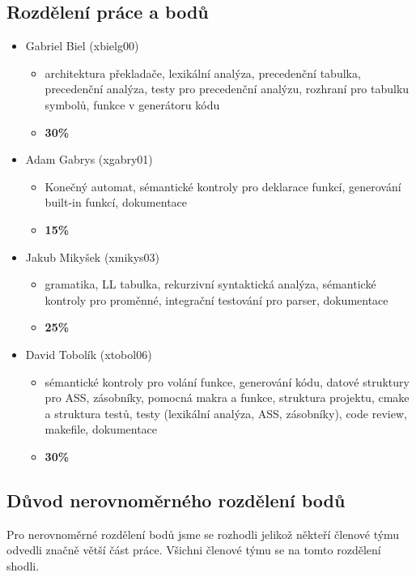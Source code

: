 \documentclass[a4paper, 12pt]{article}
\begin{document}
    \subsection{Rozdělení práce a bodů}
        \begin{itemize}
            \item Gabriel Biel (xbielg00)
                \begin{itemize}
                    \item architektura překladače, lexikální analýza, precedenční tabulka, precedenční analýza, testy pro precedenční analýzu, rozhraní pro tabulku symbolů, funkce v generátoru kódu
                    \item \textbf{30\%}
                \end{itemize}
            \item Adam Gabrys (xgabry01)
                \begin{itemize}
                    \item Konečný automat, sémantické kontroly pro deklarace funkcí, generování built-in funkcí, dokumentace
                    \item \textbf{15\%}
                \end{itemize}
            \item Jakub Mikyšek (xmikys03)
                \begin{itemize}
                    \item gramatika, LL tabulka, rekurzivní syntaktická analýza, sémantické kontroly pro proměnné, integrační testování pro parser, dokumentace
                    \item \textbf{25\%}
                \end{itemize}
            \item David Tobolík (xtobol06)
                \begin{itemize}
                    \item sémantické kontroly pro volání funkce, generování kódu, datové struktury pro ASS, zásobníky, pomocná makra a funkce, struktura projektu, cmake a struktura testů, testy (lexikální analýza, ASS, zásobníky), code review, makefile, dokumentace
                    \item \textbf{30\%}
                \end{itemize}
        \end{itemize}
    \subsection{Důvod nerovnoměrného rozdělení bodů}
    Pro nerovnoměrné rozdělení bodů jsme se rozhodli jelikož někteří členové týmu odvedli značně větší část práce.  Všichni členové týmu se na tomto rozdělení shodli.
\end{document}
